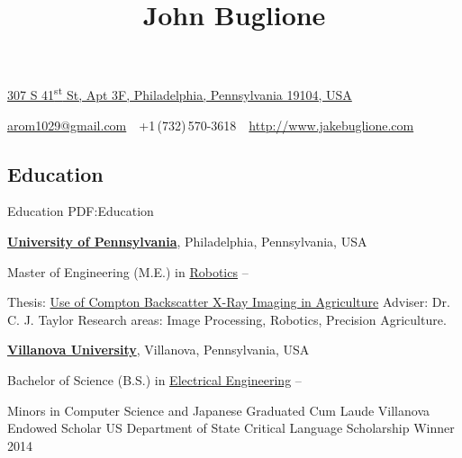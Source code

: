 \documentclass[letterpaper,10pt,oneside]{article}
\newcommand{\CVAuthor}{John Buglione}
\newcommand{\CVWebpage}{http://www.jakebuglione.com}
\begin{document}

\title{\CVAuthor}

\begin{subtitle}
\href{https://goo.gl/maps/3NSdCdpbAW32}
{307 S 41\textsuperscript{st} St, Apt 3F, Philadelphia, Pennsylvania 19104, USA}
\par
\href{mailto:arom1029@gmail.com}
{arom1029@gmail.com}
\,\SubBulletSymbol\,
+1\,(732)\,570-3618
\,\SubBulletSymbol\,
\href{\CVWebpage}
{\CVWebpage}
\end{subtitle}

\begin{body}


\section
{Education}
{Education}
{PDF:Education}

\href{http://www.upenn.edu}
{\textbf{University of Pennsylvania}},
Philadelphia, Pennsylvania, USA

\GapNoBreak
\BulletItem
Master of Engineering (M.E.) in
\href{http://www.grasp.upenn.edu}
{Robotics}
\hfill
{} --
\begin{detail}
\SubBulletItem
Thesis:
\href{http://www.jakebuglione.com/thesis}
{Use of Compton Backscatter X-Ray Imaging in Agriculture}
\SubBulletItem
Adviser:
Dr. C. J. Taylor
\SubBulletItem
Research areas:
Image Processing, Robotics, Precision Agriculture.
\end{detail}



\BigGap
\href{http://www.villanova.edu}
{\textbf{Villanova University}},
Villanova, Pennsylvania, USA

\GapNoBreak
\BulletItem
Bachelor of Science (B.S.) in
\href{https://www1.villanova.edu/villanova/engineering/undergrad/majors/electrical.html}
{Electrical Engineering}
\hfill
{} --
\begin{detail}
\SubBulletItem
Minors in Computer Science and Japanese
\SubBulletItem
Graduated Cum Laude
\SubBulletItem
Villanova Endowed Scholar
\SubBulletItem
US Department of State Critical Language Scholarship Winner 2014
\end{detail}


\end{body}
\end{document}
